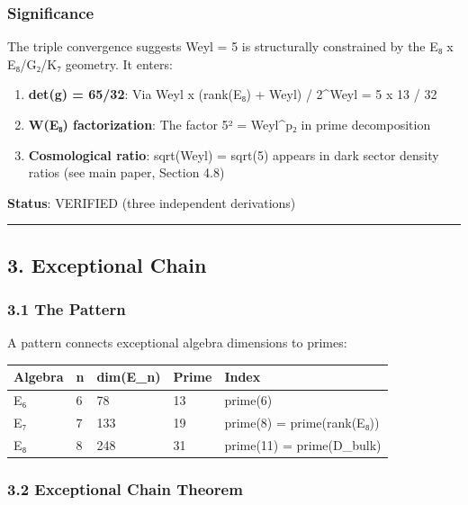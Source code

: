 \documentclass[11pt,a4paper]{article}
\begin{document}
{{{{{\subsubsection{Significance}\label{significance}

The triple convergence suggests Weyl = 5 is structurally constrained by the E₈ x E₈/G₂/K₇ geometry. It enters:

\begin{enumerate}


\item
  \textbf{det(g) = 65/32}: Via Weyl x (rank(E₈) + Weyl) / 2\^{}Weyl = 5 x 13 / 32
\item
  \textbf{\textbar W(E₈)\textbar{} factorization}: The factor 5² = Weyl\^{}p₂ in prime decomposition
\item
  \textbf{Cosmological ratio}: sqrt(Weyl) = sqrt(5) appears in dark sector density ratios (see main paper, Section 4.8)
\end{enumerate}

\textbf{Status}: VERIFIED (three independent derivations)

\begin{center}\rule{0.5\linewidth}{0.5pt}\end{center}

\subsection{3. Exceptional Chain}\label{exceptional-chain}

\subsubsection{3.1 The Pattern}\label{the-pattern}

A pattern connects exceptional algebra dimensions to primes:

{\def\LTcaptype{none} %
\begin{longtable}[]{@{}lllll@{}}
\toprule\noalign{}
Algebra & n & dim(E\_n) & Prime & Index \\
\midrule\noalign{}
\endhead
\bottomrule\noalign{}
\endlastfoot
E₆ & 6 & 78 & 13 & prime(6) \\
E₇ & 7 & 133 & 19 & prime(8) = prime(rank(E₈)) \\
E₈ & 8 & 248 & 31 & prime(11) = prime(D\_bulk) \\
\end{longtable}
\subsubsection{3.2 Exceptional Chain Theorem}\label{exceptional-chain-theorem}

}}}}}}
\end{document}
